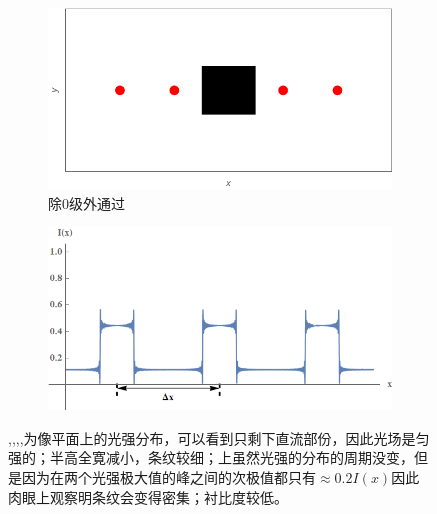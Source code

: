 \documentclass[a4paper]{article}
\begin{document}
\begin{figure}[H]
\begin{subfigure}[t]{0.4\textwidth}
        \caption{}
        \label{fig3-3-8}
    \end{subfigure}
    \begin{subfigure}[t]{0.4\textwidth}
        \centering
        \includegraphics[width=\textwidth]{simu/E.png}
        \caption{除$0$级外通过}
        \label{fig3-3-9}
    \end{subfigure}
    \begin{subfigure}[t]{0.4\textwidth}
        \centering
        \includegraphics[width=\textwidth]{simu/Eimg.png}
        \caption{}
        \label{fig3-3-10}
    \end{subfigure}
    \captionsetup{margin=2cm,format=cont}
    \caption{,,,,为像平面上的光强分布，可以看到只剩下直流部份，因此光场是匀强的；半高全寛减小，条纹较细；上虽然光强的分布的周期没变，但是因为在两个光强极大值的峰之间的次极值都只有$\approx 0.2I(x)$因此肉眼上观察明条纹会变得密集；衬比度较低。}
\end{figure}
\end{document}
